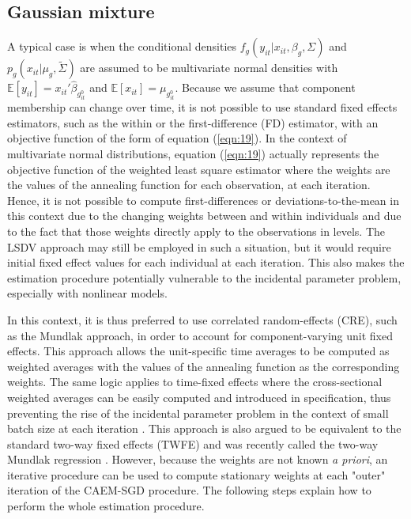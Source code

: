 \documentclass[11pt,letter]{article}
\begin{document}
\subsection{Gaussian mixture}
A typical case is when the conditional densities $f_g(y_{it}|x_{it},\beta_g,\Sigma)$ and $p_g(x_{it}|\mu_g,\tilde{\Sigma})$ are assumed to be multivariate normal densities with $\mathbb{E}[y_{it}] = x_{it}'\hat{\beta}_{g^0_{it}}$ and $\mathbb{E}[x_{it}] = \mu_{g^0_{it}}$. Because we assume that component membership can change over time, it is not possible to use standard fixed effects estimators, such as the within or the first-difference (FD) estimator, with an objective function of the form of equation (\ref{eqn:19}). In the context of multivariate normal distributions, equation (\ref{eqn:19}) actually represents the objective function of the weighted least square estimator where the weights are the values of the annealing function for each observation, at each iteration. Hence, it is not possible to compute first-differences or deviations-to-the-mean in this context due to the changing weights between and within individuals and due to the fact that those weights directly apply to the observations in levels. The LSDV approach may still be employed in such a situation, but it would require initial fixed effect values for each individual at each iteration. This also makes the estimation procedure potentially vulnerable to the incidental parameter problem, especially with nonlinear models.
\par
In this context, it is thus preferred to use correlated random-effects (CRE), such as the Mundlak approach, in order to account for component-varying unit fixed effects. This approach allows the unit-specific time averages to be computed as weighted averages with the values of the annealing function as the corresponding weights. The same logic applies to time-fixed effects where the cross-sectional weighted averages can be easily computed and introduced in specification, thus preventing the rise of the incidental parameter problem in the context of small batch size at each iteration \citep{fernandez-val_individual_2016}. This approach is also argued to be equivalent to the standard two-way fixed effects (TWFE) and was recently called the two-way Mundlak regression \citep{wooldridge_two-way_2021}. However, because the weights are not known \textit{a priori}, an iterative procedure can be used to compute stationary weights at each "outer" iteration of the CAEM-SGD procedure. The following steps explain how to perform the whole estimation procedure.
\end{document}

